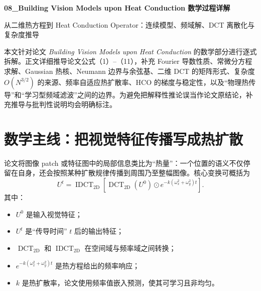 \documentclass[UTF8,12pt,a4paper,fontset=none]{ctexart}
\numberwithin{equation}{section}
\newcommand{\DCT}{\operatorname{DCT}_{2\mathrm{D}}}
\newcommand{\IDCT}{\operatorname{IDCT}_{2\mathrm{D}}}
\begin{document}
\begin{center}
  {\LARGE\bfseries 08\_Building Vision Models upon Heat Conduction 数学过程详解}\par
  \vspace{0.35em}
  {\large 从二维热方程到 Heat Conduction Operator：连续模型、频域解、DCT 离散化与复杂度推导}
\end{center}
\vspace{0.5em}

\begin{keybox}[阅读说明]
本文针对论文 \emph{Building Vision Models upon Heat Conduction} 的数学部分进行逐式拆解。正文详细推导论文公式（1）--（11），补充 Fourier 导数性质、常微分方程求解、Gaussian 热核、Neumann 边界与余弦基、二维 DCT 的矩阵形式、复杂度 $O(N^{3/2})$ 的来源、频率自适应热扩散率、HCO 的梯度与稳定性，以及“物理热传导”和“学习型频域滤波”之间的边界。为避免把解释性推论误当作论文原结论，补充推导与批判性说明均会明确标注。
\end{keybox}

\tableofcontents
\newpage

\section{数学主线：把视觉特征传播写成热扩散}

论文将图像 patch 或特征图中的局部信息类比为“热量”：一个位置的语义不仅停留在自身，还会按照某种扩散规律传播到周围乃至整幅图像。核心变换可概括为
\begin{equation}
  \boxed{
  U^t
  =\IDCT\!\left[
  \DCT(U^0)\odot
  e^{-k(\omega_x^2+\omega_y^2)t}
  \right]
  }.
  \label{eq:core-hco}
\end{equation}
其中：
\begin{itemize}[leftmargin=2.2em]
  \item $U^0$ 是输入视觉特征；
  \item $U^t$ 是“传导时间” $t$ 后的输出特征；
  \item $\DCT$ 和 $\IDCT$ 在空间域与频率域之间转换；
  \item $e^{-k(\omega_x^2+\omega_y^2)t}$ 是热方程给出的频率响应；
  \item $k$ 是热扩散率，论文使用频率值嵌入预测，使其可学习且非均匀。
\end{itemize}
\end{document}

